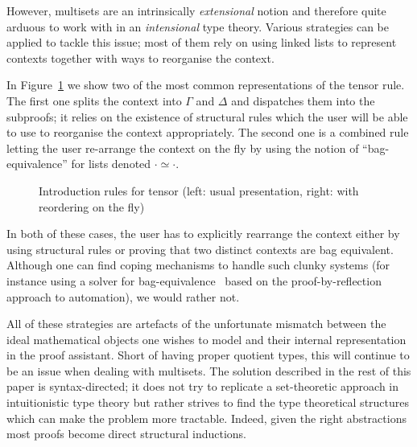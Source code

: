 However, multisets are an intrinsically \emph{extensional} notion and
therefore quite arduous to work with in an \emph{intensional} type theory.
Various strategies can be applied to tackle this issue; most of them rely
on using linked lists to represent contexts together with ways to reorganise
the context.

In Figure~\ref{rule:tensor} we show two of the most common representations
of the tensor rule. The first one splits the context into \ensuremath{\Gamma} and \ensuremath{\Delta} and dispatches
them into the subproofs; it relies on the existence of structural rules which
the user will be able to use to reorganise the context appropriately. The second
one is a combined rule letting the user re-arrange the context on the fly by using
the notion of ``bag-equivalence'' for lists denoted \ensuremath{\cdot\simeq\cdot}.

\begin{figure}[ht]
\caption{Introduction rules for tensor (left: usual presentation, right: with reordering on the fly)\label{rule:tensor}}
\end{figure}

In both of these cases, the user has to explicitly rearrange the context
either by using structural rules or proving that two distinct contexts are
bag equivalent. Although one can find coping mechanisms to handle such
clunky systems (for instance using a solver for bag-equivalence~\cite{danielsson2012bag}
based on the proof-by-reflection~\cite{boutin1997using} approach to
automation), we would rather not.

All of these strategies are artefacts of the unfortunate mismatch
between the ideal mathematical objects one wishes to model and
their internal representation in the proof assistant. Short of
having proper quotient types, this will continue to be an issue
when dealing with multisets. The solution described in the rest
of this paper is syntax-directed; it does not try to replicate a
set-theoretic approach in intuitionistic type theory but rather
strives to find the type theoretical structures which can make
the problem more tractable. Indeed, given the right abstractions
most proofs become direct structural inductions.


